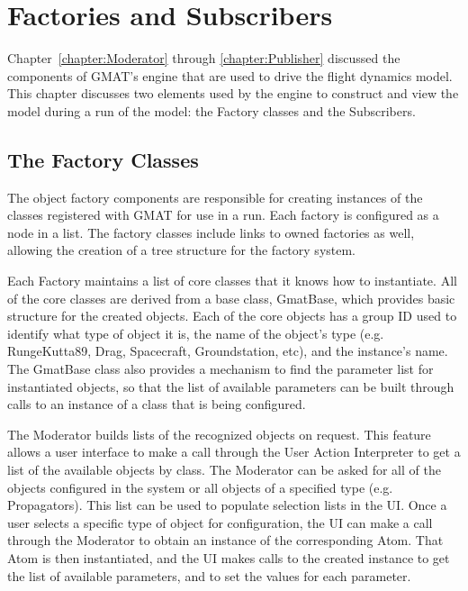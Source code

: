 \chapter{\label{chapter:Factories}Factories and Subscribers}

Chapter~\ref{chapter:Moderator} through \ref{chapter:Publisher} discussed the components of
GMAT's engine that are used to drive the flight dynamics model.  This chapter discusses two elements
used by the engine to construct and view the model during a run of the model: the Factory classes
and the Subscribers.

\section{\label{section:FactoryClasses}The Factory Classes}

The object factory components are responsible for creating instances of the classes registered with
GMAT for use in a run.  Each factory is configured as a node in a list.  The factory classes include
links to owned factories as well, allowing the creation of a tree structure for the factory system.

Each Factory maintains a list of core classes that it knows how to instantiate.  All of the core
classes are derived from a base class, GmatBase, which provides basic structure for
the created objects.  Each of the core objects has a group ID used to identify what type of object
it is, the name of the object's type (e.g. RungeKutta89, Drag, Spacecraft, Groundstation, etc), and
the instance's name.  The GmatBase class also provides a mechanism to find the parameter list for
instantiated objects, so that the list of available parameters can be built through calls to an
instance of a class that is being configured.

The Moderator builds lists of the recognized objects on request.  This feature allows a user
interface to make a call through the User Action Interpreter to get a list of the available objects
by class.  The Moderator can be asked for all of the objects configured in the system or all objects
of a specified type (e.g. Propagators).  This list can be used to populate selection lists in the
UI.  Once a user selects a specific type of object for configuration, the UI can make a call through
the Moderator to obtain an instance of the corresponding Atom.  That Atom is then instantiated, and
the UI makes calls to the created instance to get the list of available parameters, and to set the
values for each parameter.

